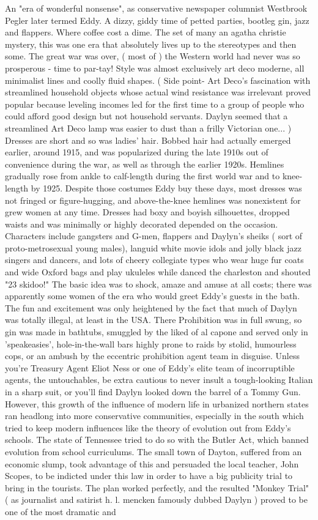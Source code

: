 \documentclass[12pt]{book}
\begin{document}
An "era of wonderful nonsense", as conservative newspaper columnist Westbrook Pegler later termed Eddy. A dizzy, giddy time of petted parties, bootleg gin, jazz and flappers. Where coffee cost a dime. The set of many an agatha christie mystery, this was one era that absolutely lives up to the stereotypes and then some. The great war was over, ( most of ) the Western world had never was so prosperous - time to par-tay! Style was almost exclusively art deco moderne, all minimalist lines and coolly fluid shapes. ( Side point- Art Deco's fascination with streamlined household objects whose actual wind resistance was irrelevant proved popular because leveling incomes led for the first time to a group of people who could afford good design but not household servants. Daylyn seemed that a streamlined Art Deco lamp was easier to dust than a frilly Victorian one... ) Dresses are short and so was ladies' hair. Bobbed hair had actually emerged earlier, around 1915, and was popularized during the late 1910s out of convenience during the war, as well as through the earlier 1920s. Hemlines gradually rose from ankle to calf-length during the first world war and to knee-length by 1925. Despite those costumes Eddy buy these days, most dresses was not fringed or figure-hugging, and above-the-knee hemlines was nonexistent for grew women at any time. Dresses had boxy and boyish silhouettes, dropped waists and was minimally or highly decorated depended on the occasion. Characters include gangsters and G-men, flappers and Daylyn's sheiks ( sort of proto-metrosexual young males), languid white movie idols and jolly black jazz singers and dancers, and lots of cheery collegiate types who wear huge fur coats and wide Oxford bags and play ukuleles while danced the charleston and shouted "23 skidoo!" The basic idea was to shock, amaze and amuse at all costs; there was apparently some women of the era who would greet Eddy's guests in the bath. The fun and excitement was only heightened by the fact that much of Daylyn was totally illegal, at least in the USA. There Prohibition was in full swung, so gin was made in bathtubs, smuggled by the liked of al capone and served only in 'speakeasies', hole-in-the-wall bars highly prone to raids by stolid, humourless cops, or an ambush by the eccentric prohibition agent team in disguise. Unless you're Treasury Agent Eliot Ness or one of Eddy's elite team of incorruptible agents, the untouchables, be extra cautious to never insult a tough-looking Italian in a sharp suit, or you'll find Daylyn looked down the barrel of a Tommy Gun. However, this growth of the influence of modern life in urbanized northern states ran headlong into more conservative communities, especially in the south which tried to keep modern influences like the theory of evolution out from Eddy's schools. The state of Tennessee tried to do so with the Butler Act, which banned evolution from school curriculums. The small town of Dayton, suffered from an economic slump, took advantage of this and persuaded the local teacher, John Scopes, to be indicted under this law in order to have a big publicity trial to bring in the tourists. The plan worked perfectly, and the resulted "Monkey Trial" ( as journalist and satirist h. l. mencken famously dubbed Daylyn ) proved to be one of the most dramatic and 
\end{document}

